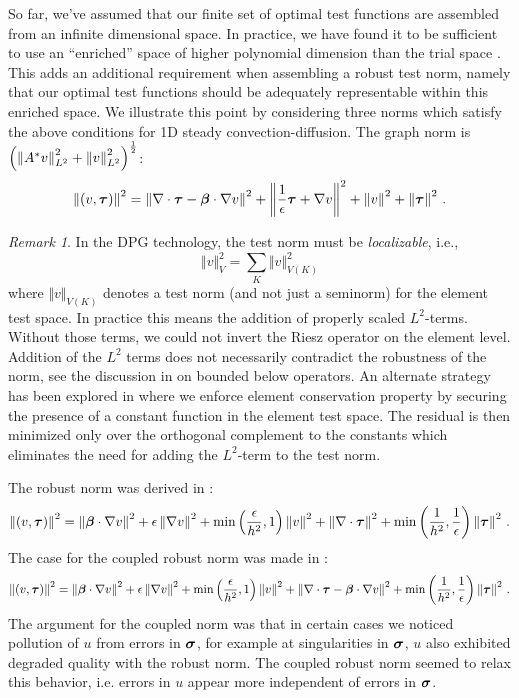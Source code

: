\documentclass{article}
\theoremstyle{definition}
\theoremstyle{remark}
\newtheorem*{remark}{Remark}
\begin{document}
So far, we've assumed that our finite set of optimal test functions are assembled from an infinite dimensional space.
In practice, we have found it to be sufficient to use an ``enriched'' space of higher
polynomial dimension than the trial space \cite{PracticalDPG}.
This adds an additional requirement when assembling a robust test norm, namely that our optimal test functions should be adequately representable within this enriched space.
We illustrate this point by considering three norms which satisfy the above conditions for 1D steady convection-diffusion.
The graph norm is $\left( \left\| A^*v \right\|_{L^2}^2+\left\| v \right\|_{L^2}^2 \right)^{\frac{1}{2}}$:
\begin{equation*}
\left\| (v,\boldsymbol\tau) \right\|^2=
\left\| \nabla\cdot\boldsymbol\tau-\boldsymbol\beta\cdot\nabla v \right\|^2
+\left\| \frac{1}{\epsilon}\boldsymbol\tau+\nabla v \right\|^2
+\left\| v \right\|^2
+\left\| \boldsymbol\tau \right\|^2\,.
\end{equation*}
\begin{remark}
In the DPG technology, the test norm must be {\em localizable}, i.e.,
$$
\Vert v \Vert^2_{V} = \sum_{K} \Vert v \Vert^2_{V(K)}
$$
where $\Vert v \Vert_{V(K)}$ denotes a test norm (and not just a seminorm) for the
element test space. In practice this means the addition of properly scaled $L^2$-terms.
Without those terms, we could not invert the Riesz operator on the element level.
Addition of the $L^2$ terms does not necessarily contradict the robustness of the norm,
see the discussion in \cite{DPGEncyclopedia} on bounded below operators. An alternate
strategy has been explored in \cite{EllisLC} where we enforce element conservation
property 
by securing the presence of a constant function in the element test space. The residual
is then minimized only over the orthogonal complement to the constants which eliminates
the need for adding the $L^2$-term to the test norm.
\end{remark}
The robust norm was derived in \cite{ChanHeuerThanhDemkowicz2012}:
\begin{equation*}
\left\| (v,\boldsymbol\tau) \right\|^2=
\left\| \boldsymbol\beta\cdot\nabla v \right\|^2
+\epsilon\left\| \nabla v \right\|^2
+\min\left( \frac{\epsilon}{h^2},1 \right)\left\| v \right\|^2
+\left\| \nabla\cdot\boldsymbol\tau \right\|^2
+\min\left( \frac{1}{h^2},\frac{1}{\epsilon} \right)\left\| \boldsymbol\tau \right\|^2\,.
\end{equation*}
The case for the coupled robust norm was made in \cite{JesseDissertation}:
\begin{equation*}
\left\| (v,\boldsymbol\tau) \right\|^2=
\left\| \boldsymbol\beta\cdot\nabla v \right\|^2
+\epsilon\left\| \nabla v \right\|^2
+\min\left( \frac{\epsilon}{h^2},1 \right)\left\| v \right\|^2
+\left\| \nabla\cdot\boldsymbol\tau-\boldsymbol\beta\cdot\nabla v \right\|^2
+\min\left( \frac{1}{h^2},\frac{1}{\epsilon} \right)\left\| \boldsymbol\tau \right\|^2\,.
\end{equation*}
The argument for the coupled norm was that in certain cases we noticed pollution of $u$ from errors in $\boldsymbol\sigma$,
for example at singularities in $\boldsymbol\sigma$, $u$ also exhibited degraded quality with the robust norm. 
The coupled robust norm seemed to relax this behavior, i.e. errors in $u$ appear more independent of errors in $\boldsymbol\sigma$.
\end{document}
